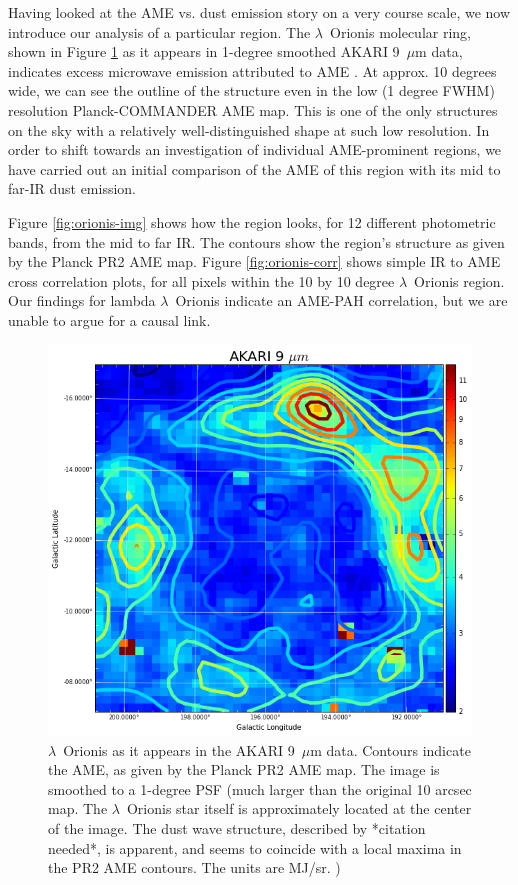 \documentclass[preprint2,longabstract]{aastex}
\begin{document}
	Having looked at the AME vs. dust emission story on a very course scale, we now introduce our analysis of a particular region. The $\lambda$~Orionis molecular ring, shown in Figure \ref{fig:orionis-akari9} as it appears in 1-degree smoothed AKARI 9~$\mu$m data, indicates excess microwave emission attributed to AME \citep{planck15XXV}. At approx. 10 degrees wide, we can see the outline of the structure even in the low (1 degree FWHM) resolution Planck-COMMANDER AME map. This is one of the only structures on the sky with a relatively well-distinguished shape at such low resolution. In order to shift towards an investigation of individual AME-prominent regions, we have carried out an initial comparison of the AME of this region with its mid to far-IR dust emission.

	Figure \ref{fig:orionis-img} shows how the region looks, for 12 different photometric bands, from the mid to far IR. The contours show the region's structure as given by the Planck PR2 AME map. Figure \ref{fig:orionis-corr} shows simple IR to AME cross correlation plots, for all pixels within the 10 by 10 degree $\lambda$~Orionis region. Our findings for lambda $\lambda$~Orionis indicate an AME-PAH correlation, but we are unable to argue for a causal link.

\begin{figure}
  \label{fig:orionis-akari9}
  \includegraphics[width=150mm]{../Plots/lOrionis_AKARI9.png}
  \centering
  \caption{$\lambda$~Orionis as it appears in the AKARI 9~$\mu$m data. Contours indicate the AME, as given by the Planck PR2 AME map. The image is smoothed to a 1-degree PSF (much larger than the original 10 arcsec map. The $\lambda$~Orionis star itself is approximately located at the center of the image. The dust wave structure, described by *citation needed*, is apparent, and seems to coincide with a local maxima in the PR2 AME contours. The units are MJ/sr. )}
\end{figure}
\end{document}
